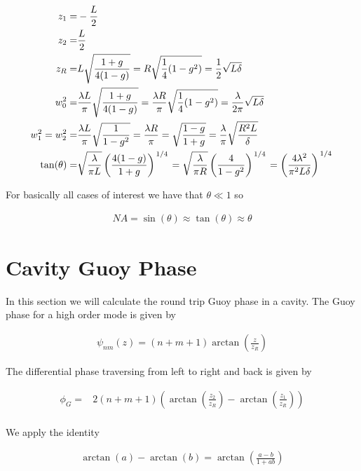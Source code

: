 \documentclass[12pt]{article}
\newcommand{\slfrac}[2]{\left.#1\middle/#2\right.}
\begin{document}
\begin{align}
z_1 =& -\frac{L}{2}\\
z_2 =& \frac{L}{2}\\
z_R =& L\sqrt{\frac{1+g}{4(1-g)}} = R\sqrt{\frac{1}{4}(1-g^2)} = \frac{1}{2}\sqrt{L\delta}\\
w_0^2 =& \frac{\lambda L}{\pi} \sqrt{\frac{1+g}{4(1-g)}} = \frac{\lambda R}{\pi} \sqrt{\frac{1}{4}(1-g^2)} = \frac{\lambda}{2\pi} \sqrt{L\delta}\\
w_1^2 = w_2^2 =& \frac{\lambda L}{\pi} \sqrt{\frac{1}{1-g^2}} = \frac{\lambda R}{\pi} = \sqrt{\frac{1-g}{1+g}} = \frac{\lambda}{\pi} \sqrt{\frac{R^2 L}{\delta}}\\
\tan(\theta) =& \sqrt{\frac{\lambda}{\pi L}}\left(\frac{4(1-g)}{1+g}\right)^{\slfrac{1}{4}} = \sqrt{\frac{\lambda}{\pi R}}\left(\frac{4}{1-g^2}\right)^{\slfrac{1}{4}} = \left(\frac{4\lambda^2}{\pi^2 L\delta}\right)^{\slfrac{1}{4}}
\end{align}

For basically all cases of interest we have that $\theta \ll 1$ so

\begin{align}
NA = \sin(\theta) \approx \tan(\theta) \approx \theta
\end{align}

\section{Cavity Guoy Phase}

In this section we will calculate the round trip Guoy phase in a cavity. The Guoy phase for a high order mode is given by

\begin{align}
\psi_{nm}(z) = (n+m+1)\arctan\left(\frac{z}{z_R}\right)
\end{align}

The differential phase traversing from left to right and back is given by

\begin{align}
\phi_G =& 2(n+m+1)\left(\arctan\left(\frac{z_2}{z_R}\right) - \arctan\left(\frac{z_1}{z_R}\right)\right)\\
\end{align}

We apply the identity

\begin{align}
\arctan(a) - \arctan(b) = \arctan\left(\frac{a-b}{1+ab}\right)
\end{align}
\end{document}
